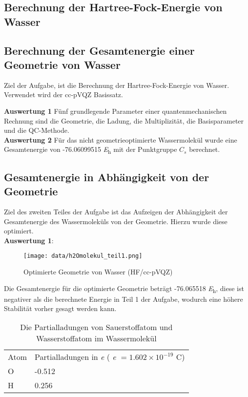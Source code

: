 \documentclass[12pt]{article}
\begin{document}
\tableofcontents 
\newpage
\begin{onehalfspace}
\raggedright
\section{Berechnung der Hartree-Fock-Energie von Wasser}
\subsection{Berechnung der Gesamtenergie einer Geometrie von Wasser}

Ziel der Aufgabe, ist die Berechnung der Hartree-Fock-Energie von Wasser. Verwendet wird der cc-pVQZ Basissatz.


\textbf{Auswertung 1} Fünf grundlegende Parameter einer quantenmechanischen Rechnung sind die Geometrie, die Ladung, die Multiplizität, die Basisparameter und die QC-Methode. \\
\textbf{Auswertung 2} Für das nicht geometrieoptimierte Wassermolekül wurde eine Gesamtenergie von -76.06099515 \si{\hartree} mit der Punktgruppe $C _s$ berechnet.\\


\subsection{Gesamtenergie in Abhängigkeit von der Geometrie}
Ziel des zweiten Teiles der Aufgabe ist das Aufzeigen der Abhängigkeit der Gesamtenergie des Wassermoleküls von der Geometrie. Hierzu wurde diese optimiert.\\
\textbf{Auswertung 1}:\\
\begin{figure}[!htbp]
\centering
\texttt{[image: data/h2Omolekul\_teil1.png]}
  \caption{Optimierte Geometrie von Wasser (HF/cc-pVQZ)}
\end{figure}
\noindent
Die Gesamtenergie für die optimierte Geometrie beträgt -76.065518 \si{\hartree}, 
diese ist negativer als die berechnete Energie in Teil 1 der Aufgabe, wodurch eine höhere Stabilität vorher gesagt werden kann. \\
\newpage

\begin{table}[htbp]
\centering
\caption{Die Partialladungen von Sauerstoffatom und Wasserstoffatom im Wassermolekül}
\begin{tabular}{ll}
\toprule
Atom &  Partialladungen in \si{\elementarycharge} ( \si{\elementarycharge}  $= 1.602 \times 10^{-19}$ \si{\coulomb})\\
O & -0.512\\
H &  0.256\\
\midrule
\bottomrule


\end{tabular}
\end{table}
\end{onehalfspace}
\end{document}
